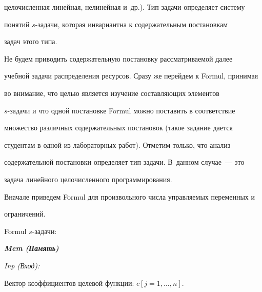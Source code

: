 целочисленная линейная, нелинейная и~др.). Тип задачи определяет систему


понятий $s$-за\-да\-чи, которая инвариантна к содержательным постановкам


задач этого типа.








  Не будем приводить содержательную постановку рассматриваемой далее


учебной задачи распределения ресурсов. Сразу же перейдем к Formul, принимая


во внимание, что целью является изучение составляющих элементов


  $s$-за\-да\-чи и что одной постановке Formul можно поставить в соответствие


множество различных содержательных постановок (такое задание дается


студентам в одной из лабораторных работ). Отметим только, что анализ


содержательной постановки определяет тип задачи. В~данном случае~--- это


задача линейного целочисленного программирования.








  Вначале приведем Formul для произвольного числа управляемых переменных и


ограничений.





\smallskip





  Formul $s$-задачи:





  \smallskip








  {\bfseries\textit{Mem (Память)}}





  \textit{Inp (Вход):}





  \noindent


Вектор коэффициентов целевой функции: $c[j=1,\ldots, n]$.





